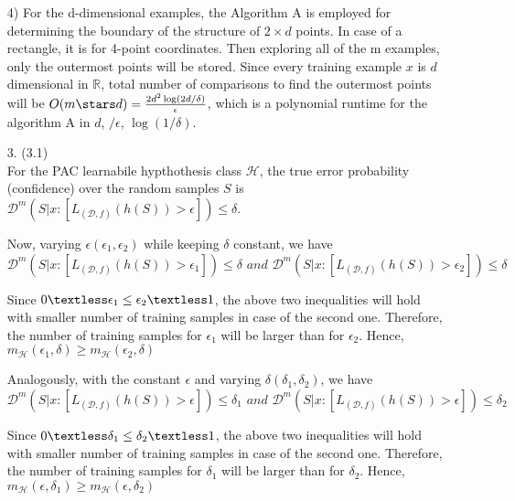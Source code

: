 \documentclass[12pt,letterpaper]{article}
\begin{document}
\begin{enumerate}
4)  For the d-dimensional examples, the Algorithm A is employed for determining the boundary of the structure of $2\times d$ points. In case of a rectangle, it is for 4-point coordinates. Then exploring all of the m examples, only the outermost points will be stored. Since every training example $x$ is $d$ dimensional in $\mathbb{R}$, total number of comparisons to find the outermost points will be $O(m\stars d) = \frac{2d^2\log(2d/\delta)}{\epsilon}$, which is a polynomial runtime for the algorithm A in $d$, $/\epsilon$, $\log(1/\delta)$.

\item[3.] (3.1)\\
For the PAC learnabile hypthothesis class $\mathcal{H}$, the true error probability (confidence) over the random samples $S$ is  
$\mathcal{D}^m({S|x: [L_{(\mathcal{D}, f)}(h(S)) \gt \epsilon]}) \leq \delta$.

Now, varying $\epsilon (\epsilon_1, \epsilon_2)$ while keeping $\delta$ constant, we have
\begin{equation*}
    \mathcal{D}^m({S|x: [L_{(\mathcal{D},f)}(h(S)) \gt \epsilon_1]}) \leq \delta 
    \hspace{4pt} and \hspace{4pt}
    \mathcal{D}^m({S|x: [L_{(\mathcal{D},f)}(h(S)) \gt \epsilon_2]}) \leq \delta
\end{equation*}

Since $0 \textless\epsilon_1\leq \epsilon_2 \textless 1$, the above two inequalities will hold with smaller number of training samples in case of the second one. Therefore, the number of training samples for $\epsilon_1$ will be larger than for $\epsilon_2$. Hence, $m_\mathcal{H}(\epsilon_1, \delta) \ge m_\mathcal{H}(\epsilon_2, \delta)$

Analogously, with the constant $\epsilon$ and varying $\delta (\delta_1, \delta_2)$, we have
\begin{equation*}
    \mathcal{D}^m({S|x: [L_{(\mathcal{D},f)}(h(S)) \gt \epsilon]}) \leq \delta_1
    \hspace{4pt} and \hspace{4pt}
    \mathcal{D}^m({S|x: [L_{(\mathcal{D},f)}(h(S)) \gt \epsilon]}) \leq \delta_2
\end{equation*}


Since $0 \textless \delta_1\leq \delta_2 \textless 1$, the above two inequalities will hold with smaller number of training samples in case of the second one. Therefore, the number of training samples for $\delta_1$ will be larger than for $\delta_2$. 
Hence, $m_\mathcal{H}(\epsilon, \delta_1) \ge m_\mathcal{H}(\epsilon, \delta_2)$



\end{enumerate}
\end{document}

